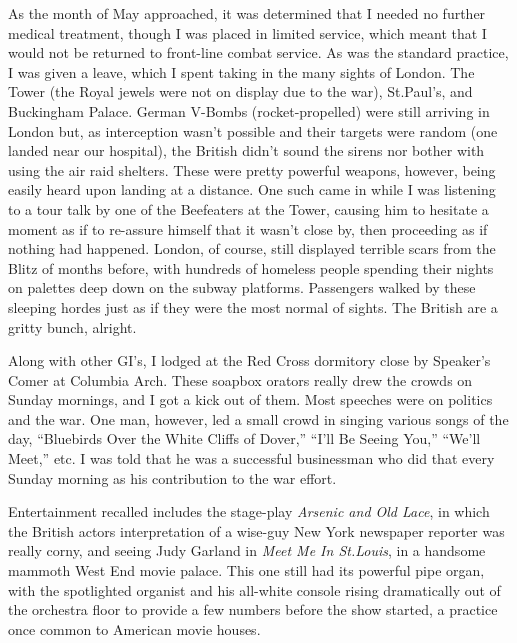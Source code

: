 \documentclass[../m3y]{subfiles}
\begin{document}
As the month of May approached, it was determined that I needed no further medical treatment, though I was placed in limited service, which meant that I would not be returned to front-line combat service. As was the standard practice, I was given a leave, which I spent taking in the many sights of London. The Tower (the Royal jewels were not on display due to the war), St.\@ Paul's, and Buckingham Palace. German V-Bombs (rocket-propelled) were still arriving in London but, as interception wasn't possible and their targets were random (one landed near our hospital), the British didn't sound the sirens nor bother with using the air raid shelters. These were pretty powerful weapons, however, being easily heard upon landing at a distance. One such came in while I was listening to a tour talk by one of the Beefeaters at the Tower, causing him to hesitate a moment as if to re-assure himself that it wasn't close by, then proceeding as if nothing had happened. London, of course, still displayed terrible scars from the Blitz of months before, with hundreds of homeless people spending their nights on palettes deep down on the subway platforms. Passengers walked by these sleeping hordes just as if they were the most normal of sights. The British are a gritty bunch, alright.

Along with other GI's, I lodged at the Red Cross dormitory close by Speaker's Comer at Columbia Arch. These soapbox orators really drew the crowds on Sunday mornings, and I got a kick out of them. Most speeches were on politics and the war. One man, however, led a small crowd in singing various songs of the day, ``Bluebirds Over the White Cliffs of Dover,'' ``I'll Be Seeing You,'' ``We'll Meet,'' etc\@. I was told that he was a successful businessman who did that every Sunday morning as his contribution to the war effort.

Entertainment recalled includes the stage-play \emph{Arsenic and Old Lace}, in which the British actors interpretation of a wise-guy New York newspaper reporter was really corny, and seeing Judy Garland in \emph{Meet Me In St.\@ Louis}, in a handsome mammoth West End movie palace. This one still had its powerful pipe organ, with the spotlighted organist and his all-white console rising dramatically out of the orchestra floor to provide a few numbers before the show started, a practice once common to American movie houses.
\end{document}
